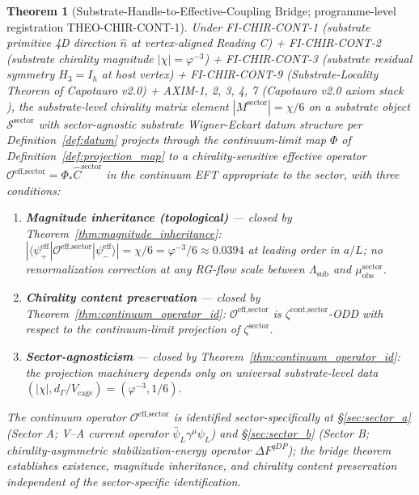 \documentclass[11pt,letterpaper]{article}
\newtheorem{theorem}{Theorem}[section]
\newcommand{\Phicont}{\Phi_*}
\newcommand{\Lambdasub}{\Lambda_{\text{sub}}}
\newcommand{\muobs}{\mu_{\text{obs}}}
\newcommand{\DeltaFqDP}{\Delta F^{qDP}}
\newcommand{\Vcage}{V_{\text{cage}}}
\newcommand{\dGamma}{d_\Gamma}
\begin{document}
\begin{theorem}[Substrate-Handle-to-Effective-Coupling Bridge; programme-level registration THEO-CHIR-CONT-1]
\label{thm:bridge}
Under FI-CHIR-CONT-1 (substrate primitive 4D direction $\hat{n}$ at vertex-aligned Reading C) + FI-CHIR-CONT-2 (substrate chirality magnitude $|\chi| = \varphi^{-3}$) + FI-CHIR-CONT-3 (substrate residual symmetry $H_3 = I_h$ at host vertex) + FI-CHIR-CONT-9 (Substrate-Locality Theorem of Capotauro v2.0) + AXIM-1, 2, 3, 4, 7 (Capotauro v2.0 axiom stack \cite{AxiomDocument, Capotauro}), the substrate-level chirality matrix element $|M^{\text{sector}}| = \chi/6$ on a substrate object $\mathcal{S}^{\text{sector}}$ with sector-agnostic substrate Wigner-Eckart datum structure per Definition~\ref{def:datum} projects through the continuum-limit map $\Phi$ of Definition~\ref{def:projection_map} to a chirality-sensitive effective operator $\mathcal{O}^{\text{eff,sector}} = \Phicont\hat{C}^{\text{sector}}$ in the continuum EFT appropriate to the sector, with three conditions:
\begin{enumerate}[leftmargin=*]
\item \textbf{Magnitude inheritance (topological)} --- closed by Theorem~\ref{thm:magnitude_inheritance}: $|\langle\psi^{\text{eff}}_+|\mathcal{O}^{\text{eff,sector}}|\psi^{\text{eff}}_-\rangle| = \chi/6 = \varphi^{-3}/6 \approx 0.0394$ at leading order in $a/L$; no renormalization correction at any RG-flow scale between $\Lambdasub$ and $\muobs^{\text{sector}}$.
\item \textbf{Chirality content preservation} --- closed by Theorem~\ref{thm:continuum_operator_id}: $\mathcal{O}^{\text{eff,sector}}$ is $\zeta^{\text{cont,sector}}$-ODD with respect to the continuum-limit projection of $\zeta^{\text{sector}}$.
\item \textbf{Sector-agnosticism} --- closed by Theorem~\ref{thm:continuum_operator_id}: the projection machinery depends only on universal substrate-level data $(|\chi|, \dGamma/\Vcage) = (\varphi^{-3}, 1/6)$.
\end{enumerate}
The continuum operator $\mathcal{O}^{\text{eff,sector}}$ is identified sector-specifically at §\ref{sec:sector_a} (Sector A; V--A current operator $\bar{\psi}_L\gamma^\mu\psi_L$) and §\ref{sec:sector_b} (Sector B; chirality-asymmetric stabilization-energy operator $\DeltaFqDP$); the bridge theorem establishes existence, magnitude inheritance, and chirality content preservation independent of the sector-specific identification.
\end{theorem}
\end{document}
